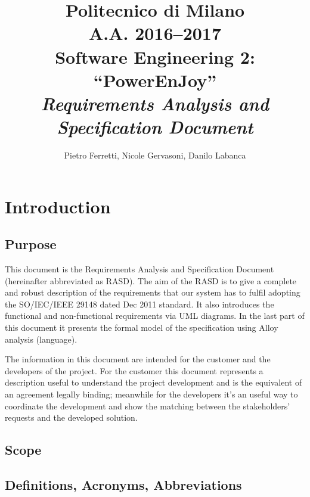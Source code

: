\documentclass[english]{article}
\begin{document}
\title{Politecnico di Milano\\
 A.A. 2016–2017 \\
Software Engineering 2: “PowerEnJoy” \\
\emph{Requirements Analysis and Specification Document}}

\author{Pietro Ferretti, Nicole Gervasoni, Danilo Labanca}

\maketitle
\newpage{}

\tableofcontents{}

\newpage{}

\section{Introduction}

\subsection{Purpose}

This document is the Requirements Analysis and Specification Document
(hereinafter abbreviated as RASD). The aim of the RASD is to give
a complete and robust description of the requirements that our system
has to fulfil adopting the SO/IEC/IEEE 29148 dated Dec 2011 standard.
It also introduces the functional and non-functional requirements
via UML diagrams. In the last part of this document it presents the
formal model of the specification using Alloy analysis (language). 

The information in this document are intended for the customer and
the developers of the project. For the customer this document represents
a description useful to understand the project development and is
the equivalent of an agreement legally binding; meanwhile for the
developers it’s an useful way to coordinate the development and show
the matching between the stakeholders’ requests and the developed
solution.

\subsection{Scope}

\subsection{Definitions, Acronyms, Abbreviations}
\end{document}
